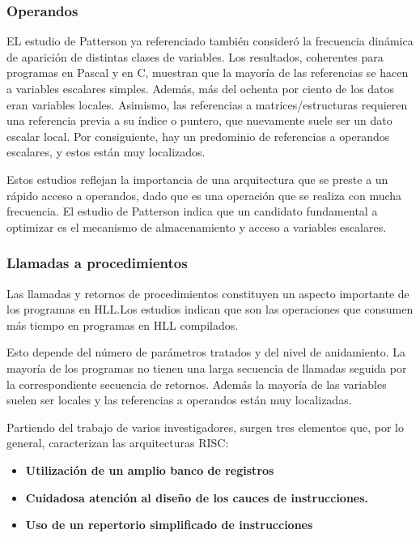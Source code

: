 \subsubsection*{Operandos}

EL estudio de Patterson ya referenciado también consideró la frecuencia dinámica de aparición de distintas clases de variables. Los resultados, coherentes para programas en Pascal y en C, muestran que la mayoría de las referencias se hacen a variables escalares simples. Además, más del ochenta por ciento de los datos  eran variables locales. Asimismo, las referencias a matrices/estructuras requieren una referencia previa a su índice o puntero, que nuevamente suele ser un dato escalar local. Por consiguiente, hay un predominio de referencias a operandos escalares, y estos están muy localizados.

Estos estudios reflejan la importancia de una arquitectura que se preste a un rápido acceso a operandos, dado que es una operación que se realiza con mucha frecuencia. El estudio de Patterson indica que un candidato fundamental a optimizar es el mecanismo de almacenamiento y acceso a variables escalares.

\subsubsection*{Llamadas a procedimientos}

Las llamadas y retornos de procedimientos constituyen un aspecto importante de los programas en HLL.\@ Los estudios indican que son las operaciones que consumen más tiempo en programas en HLL compilados.

Esto depende del número de parámetros tratados y del nivel de anidamiento. La mayoría de los programas no tienen una larga secuencia de llamadas seguida por la correspondiente secuencia de retornos. Además la mayoría de las variables suelen ser locales y las referencias a operandos están muy localizadas.

Partiendo del trabajo de varios investigadores, surgen tres elementos que, por lo general, caracterizan las arquitecturas RISC:\@

\begin{itemize}
  \item \textbf{Utilización de un amplio banco de registros}
  \item \textbf{Cuidadosa atención al diseño de los cauces de instrucciones.}
  \item \textbf{Uso de un repertorio simplificado de instrucciones}
\end{itemize}

